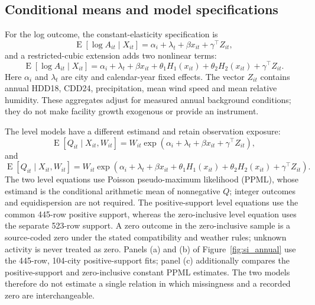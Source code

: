 \subsection{Conditional means and model specifications}
For the log outcome, the constant-elasticity specification is
\begin{equation}
 \operatorname{E}[\log A_{it}\mid X_{it}]
 =\alpha_i+\lambda_t+\beta x_{it}+\gamma^{\top}Z_{it},
 \label{eq:si-log-l0}
\end{equation}
and a restricted-cubic extension adds two nonlinear terms:
\begin{equation}
 \operatorname{E}[\log A_{it}\mid X_{it}]
 =\alpha_i+\lambda_t+\beta x_{it}+
 \theta_1H_1(x_{it})+\theta_2H_2(x_{it})+\gamma^{\top}Z_{it}.
 \label{eq:si-log-models}
\end{equation}
Here $\alpha_i$ and $\lambda_t$ are city and calendar-year fixed effects.  The
vector $Z_{it}$ contains annual HDD18, CDD24, precipitation, mean wind speed
and mean relative humidity.  These aggregates adjust for measured annual
background conditions; they do not make facility growth exogenous or provide an
instrument.

The level models have a different estimand and retain observation exposure:
\begin{equation}
 \operatorname{E}[Q_{it}\mid X_{it},W_{it}]
 =W_{it}\exp\!\left(\alpha_i+\lambda_t+\beta x_{it}
 +\gamma^{\top}Z_{it}\right),
 \label{eq:si-p0}
\end{equation}
and
\begin{equation}
 \operatorname{E}[Q_{it}\mid X_{it},W_{it}]
 =W_{it}\exp\!\left(\alpha_i+\lambda_t+\beta x_{it}
 +\theta_1H_1(x_{it})+\theta_2H_2(x_{it})
 +\gamma^{\top}Z_{it}\right).
 \label{eq:si-p1}
\end{equation}
The two level equations use Poisson pseudo-maximum likelihood (PPML), whose
estimand is the conditional arithmetic mean of nonnegative $Q$; integer
outcomes and equidispersion are not required.  The positive-support level
equations use the common 445-row positive support, whereas the zero-inclusive
level equation uses the separate 523-row support.  A zero outcome in the zero-inclusive sample is a
source-coded zero under the stated compatibility and weather rules; unknown
activity is never treated as zero.  Panels (a) and (b) of
Figure~\ref{fig:si_annual} use the 445-row, 104-city positive-support fits;
panel (c) additionally compares the positive-support and zero-inclusive
constant PPML estimates.  The two models therefore do not estimate a single
relation in which missingness and a recorded zero are interchangeable.

